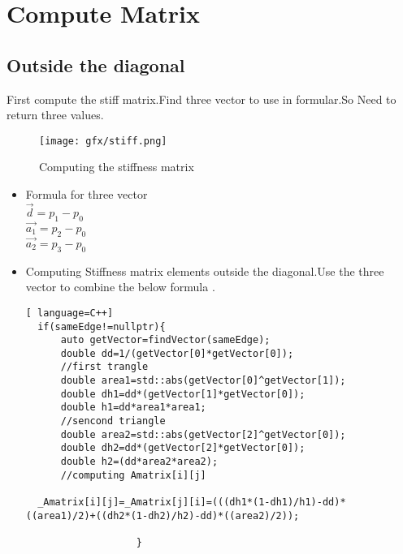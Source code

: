 \documentclass[a4,10pt]{article}
\begin{document}
  

  \section{Compute Matrix}\vspace{5pt}
  \subsection*{Outside the diagonal}\vspace{5pt}
First compute the stiff matrix.Find three vector to use in formular.So Need to return three values.

    \begin{figure}[H]
      \centering
      \texttt{[image: gfx/stiff.png]}

      \caption{Computing the stiffness matrix\cite{IEEEhowto:kopka}}
      \label{fig:TriangleFacets}
    \end{figure}



    \begin{itemize}
      \item Formula for three vector\\
      $\overrightarrow{d}=p_{1}-p_{0}$\vspace{5pt}\\
$\overrightarrow{{a}_{1}}=p_{2}-p_{0}$\vspace{5pt}\\
$\overrightarrow{{a}_{2}}=p_{3}-p_{0}$\vspace{5pt}
\item Computing Stiffness matrix elements outside the diagonal.Use the three vector to combine the below formula .
\begin{lstlisting}[ language=C++] 
  if(sameEdge!=nullptr){
      auto getVector=findVector(sameEdge);
      double dd=1/(getVector[0]*getVector[0]);
      //first trangle
      double area1=std::abs(getVector[0]^getVector[1]);
      double dh1=dd*(getVector[1]*getVector[0]);
      double h1=dd*area1*area1;
      //sencond triangle
      double area2=std::abs(getVector[2]^getVector[0]);
      double dh2=dd*(getVector[2]*getVector[0]);
      double h2=(dd*area2*area2);
      //computing Amatrix[i][j]

  _Amatrix[i][j]=_Amatrix[j][i]=(((dh1*(1-dh1)/h1)-dd)*
((area1)/2)+((dh2*(1-dh2)/h2)-dd)*((area2)/2));

                   }
\end{lstlisting} 
\end{itemize}
\end{document}
